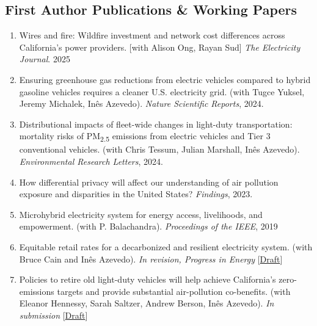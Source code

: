 \documentclass[centered, 11pt]{res}
\begin{document}
\begin{resume}
\section{First Author Publications \& Working Papers  }
\begin{enumerate}
    \item Wires and fire: Wildfire investment and network cost differences across California's power providers. [with Alison Ong, Rayan Sud] {\textit{The Electricity Journal}}. 2025
    \item  Ensuring greenhouse gas reductions from electric vehicles compared to hybrid gasoline vehicles requires a cleaner U.S. electricity grid. (with Tugce Yuksel, Jeremy Michalek, In\^{e}s Azevedo). \textit{Nature Scientific Reports}, 2024.
    \item Distributional impacts of fleet-wide changes in light-duty transportation: mortality risks of PM\textsubscript{2.5} emissions from electric vehicles and Tier 3 conventional vehicles. (with Chris Tessum, Julian Marshall, In\^{e}s Azevedo). \textit{Environmental Research Letters}, 2024.
    \item How differential privacy will affect our understanding of air pollution exposure and disparities in the United States? \textit{Findings}, 2023.
    \item Microhybrid electricity system for energy access, livelihoods, and empowerment. (with P. Balachandra). \textit{Proceedings of the IEEE}, 2019
    \item Equitable retail rates for a decarbonized and resilient electricity system. (with Bruce Cain and In\^{e}s Azevedo). \textit{In revision, Progress in Energy} [\href{https://madalsa.org/Papers/RateDesign/Draft_Perspective.pdf}{Draft}]
    \item Policies to retire old light-duty vehicles will help achieve California's zero-emissions targets and provide substantial air-pollution co-benefits. (with Eleanor Hennessy, Sarah Saltzer, Andrew Berson, In\^{e}s Azevedo). \textit{In submission} [\href{https://madalsa.org/Papers/stock_flow/LDV_draft.pdf}{Draft}]

\end{enumerate}

\end{resume}
\end{document}
